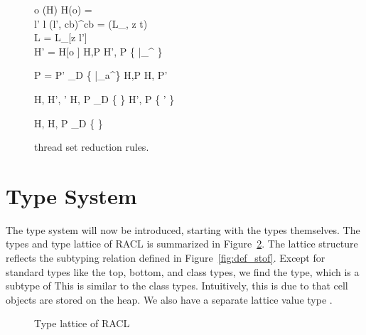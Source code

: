 \begin{figure}
  {
    o \in \dom(H) \andalso H(o) =  \\ 
    l' \sqsubseteq l \andalso (l', cb)^\iota \in \DEP \andalso cb = (L_{}, z
    \Rightarrow t) \\
    L = L_{}[z \mapsto l'] \\
    H' = H[o \mapsto {}]
  }
  {
    H,P \Rrightarrow H', P \cup \left\{  \circ \varepsilon
    |_{\ocap}^{\iota} \right\}
  }

  \RuleSpace{}

  {P = P' \cup_D \left\{  \circ \varepsilon |_a^\iota \right\} }
  {H,P \Rrightarrow H, P'}

  \RuleSpace{}

  {H, \FS \twoheadrightarrow H', \FS'}
  {H, P \cup_D \left\{ \FS \right\} \Rrightarrow H', P \cup \left\{ \FS' \right\} }

  \RuleSpace{}

  {H, \FS \twoheadrightarrow \Error}
  {H, P \cup_D \left\{ \FS \right\} \Rrightarrow \Error }
  \caption{\RACL{} thread set reduction rules.}
  \label{fig:threads_red_rules}
\end{figure}


\section{Type System}
\label{sec:type_system}

The type system will now be introduced, starting with the types themselves.  The
types and type lattice of RACL is summarized in Figure~\ref{fig:racl_typelat}.
The lattice structure reflects the subtyping relation defined in
Figure~\ref{fig:def_stof}.  Except for standard types like the top, bottom, and
class types, we find the \CellType{} type, which is a subtype of \AnyRefType{}
This is similar to the class types. Intuitively, this is due to that cell objects are
stored on the heap. We also have a separate lattice value type \LatType{}. 

\begin{figure}[]
  \centering
  \caption{Type lattice of RACL}
  \label{fig:racl_typelat}
\end{figure}

